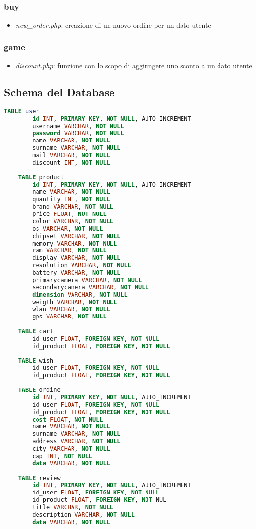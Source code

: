 \documentclass[12pt]{extarticle}
\begin{document}
\subsubsection*{buy}
\begin{itemize}
    \item \textit{new\_order.php}: creazione di un nuovo ordine per un dato utente
\end{itemize}

\subsubsection*{game}
\begin{itemize}
    \item  \textit{discount.php}: funzione con lo scopo di aggiungere uno sconto a un dato utente
\end{itemize}


\subsection{Schema del Database}
\begin{lstlisting}[language=SQL]
    TABLE user
        id INT, PRIMARY KEY, NOT NULL, AUTO_INCREMENT
        username VARCHAR, NOT NULL
        password VARCHAR, NOT NULL
        name VARCHAR, NOT NULL
        surname VARCHAR, NOT NULL
        mail VARCHAR, NOT NULL
        discount INT, NOT NULL
    
    TABLE product
        id INT, PRIMARY KEY, NOT NULL, AUTO_INCREMENT
        name VARCHAR, NOT NULL
        quantity INT, NOT NULL
        brand VARCHAR, NOT NULL
        price FLOAT, NOT NULL
        color VARCHAR, NOT NULL
        os VARCHAR, NOT NULL
        chipset VARCHAR, NOT NULL
        memory VARCHAR, NOT NULL
        ram VARCHAR, NOT NULL
        display VARCHAR, NOT NULL
        resolution VARCHAR, NOT NULL
        battery VARCHAR, NOT NULL
        primarycamera VARCHAR, NOT NULL
        secondarycamera VARCHAR, NOT NULL
        dimension VARCHAR, NOT NULL
        weigth VARCHAR, NOT NULL
        wlan VARCHAR, NOT NULL
        gps VARCHAR, NOT NULL
    
    TABLE cart
        id_user FLOAT, FOREIGN KEY, NOT NULL
        id_product FLOAT, FOREIGN KEY, NOT NULL
    
    TABLE wish
        id_user FLOAT, FOREIGN KEY, NOT NULL
        id_product FLOAT, FOREIGN KEY, NOT NULL
    
    TABLE ordine
        id INT, PRIMARY KEY, NOT NULL, AUTO_INCREMENT
        id_user FLOAT, FOREIGN KEY, NOT NULL
        id_product FLOAT, FOREIGN KEY, NOT NULL
        cost FLOAT, NOT NULL
        name VARCHAR, NOT NULL
        surname VARCHAR, NOT NULL
        address VARCHAR, NOT NULL
        city VARCHAR, NOT NULL
        cap INT, NOT NULL
        data VARCHAR, NOT NULL
    
    TABLE review
        id INT, PRIMARY KEY, NOT NULL, AUTO_INCREMENT
        id_user FLOAT, FOREIGN KEY, NOT NULL
        id_product FLOAT, FOREIGN KEY, NOT NUL
        title VARCHAR, NOT NULL
        description VARCHAR, NOT NULL
        data VARCHAR, NOT NULL
\end{lstlisting}
\end{document}
